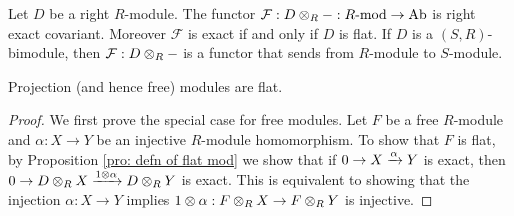 \medskip

\begin{cor}
    Let $D$ be a right $R$-module. The functor $\mathcal F:D\otimes_R -: R\text{-mod} \to \text{Ab}$ is right exact covariant. Moreover $\mathcal F$ is exact if and only if $D$ is flat. If $D$ is a $(S,R)$-bimodule, then $\mathcal F: D\otimes_R -$ is a functor that sends from $R$-module to $S$-module.
\end{cor}

\medskip

\begin{thm}
    Projection (and hence free) modules are flat.
\end{thm}
\begin{proof}
    We first prove the special case for free modules. Let $F$ be a free $R$-module and $\alpha:X\to Y$ be an injective $R$-module homomorphism. To show that $F$ is flat, by Proposition \ref{pro: defn of flat mod} we show that if $0 \to X \xrightarrow{\alpha} Y$ is exact, then $0\to D\otimes_R X \xrightarrow{1\otimes\alpha} D\otimes_R Y$ is exact. This is equivalent to showing that the injection $\alpha:X\to Y$ implies $1\otimes \alpha:F\otimes_R X\to F\otimes_R Y$ is injective.


\end{proof}
